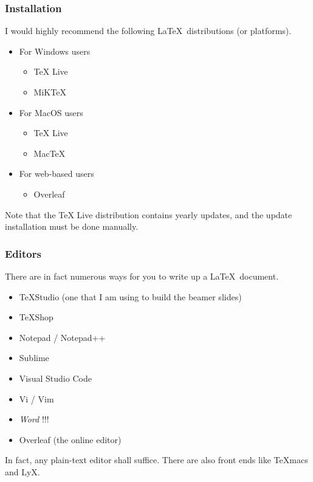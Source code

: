 \documentclass[11pt]{beamer}
\begin{document}
\begin{frame}
	\frametitle{Installation}
	
	I would highly recommend the following \LaTeX \ distributions (or platforms).
	
	\begin{itemize}
		\item For Windows users
			\begin{itemize}
				\item TeX Live
				\item MiKTeX
			\end{itemize}
		\item For MacOS users
			\begin{itemize}
				\item TeX Live
				\item MacTeX
			\end{itemize}
		\item For web-based users
			\begin{itemize}
				\item Overleaf
			\end{itemize}
	\end{itemize}

	Note that the TeX Live distribution contains yearly updates, and the update installation must be done manually.

\end{frame}

\begin{frame}
\frametitle{Editors}

	There are in fact numerous ways for you to write up a \LaTeX \ document.

	\begin{itemize}
		\item TeXStudio (one that I am using to build the beamer slides)
		\item TeXShop
		\item Notepad / Notepad++
		\item Sublime
		\item Visual Studio Code
		\item Vi / Vim
		\item \emph{Word} !!!
		\item Overleaf (the online editor)
	\end{itemize}

	In fact, any plain-text editor shall suffice.
    There are also front ends like TeXmacs and LyX.

\end{frame}
\end{document}

